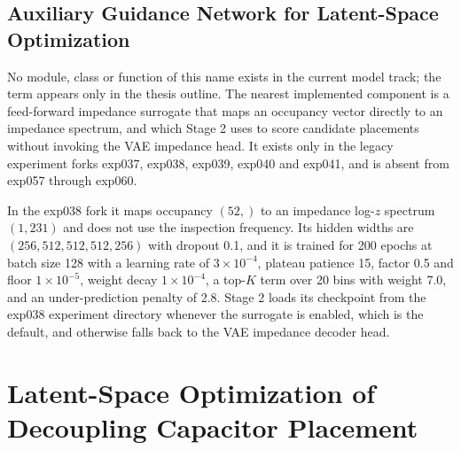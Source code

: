 

\subsection{Auxiliary Guidance Network for Latent-Space Optimization}
\label{subsec:aux_guidance_network}

No module, class or function of this name exists in the current model track; the term appears only in
the thesis outline. The nearest implemented component is a feed-forward impedance surrogate that maps
an occupancy vector directly to an impedance spectrum, and which Stage 2 uses to score candidate
placements without invoking the VAE impedance head. It exists only in the legacy experiment forks
exp037, exp038, exp039, exp040 and exp041, and is absent from exp057 through exp060.

In the exp038 fork it maps occupancy $(52,)$ to an impedance log-$z$ spectrum $(1, 231)$ and does not
use the inspection frequency. Its hidden widths are $(256, 512, 512, 512, 256)$ with dropout 0.1, and
it is trained for 200 epochs at batch size 128 with a learning rate of $3 \times 10^{-4}$, plateau
patience 15, factor 0.5 and floor $1 \times 10^{-5}$, weight decay $1 \times 10^{-4}$, a top-$K$ term
over 20 bins with weight 7.0, and an under-prediction penalty of 2.8. Stage 2 loads its checkpoint
from the exp038 experiment directory whenever the surrogate is enabled, which is the default, and
otherwise falls back to the VAE impedance decoder head.


\section{Latent-Space Optimization of Decoupling Capacitor Placement}
\label{sec:latent_opt_decap}

